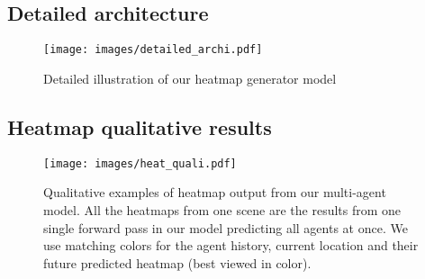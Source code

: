 \documentclass{article} \usepackage{iclr2022_conference,times}
\begin{document}
\clearpage
\subsection{Detailed architecture}
\label{archi}

\begin{figure}[h]
\centerline{\texttt{[image: images/detailed\_archi.pdf]}}
\caption{Detailed illustration of our heatmap generator model}
\label{fig:heat}
\end{figure}

\clearpage

\subsection{Heatmap qualitative results}

\begin{figure}[h]
\centerline{\texttt{[image: images/heat\_quali.pdf]}}
\caption{Qualitative examples of heatmap output from our multi-agent model. All the heatmaps from one scene are the results from one single forward pass in our model predicting all agents at once. We use matching colors for the agent history, current location and their future predicted heatmap (best viewed in color).}
\label{fig:heat}
\end{figure}
\end{document}
